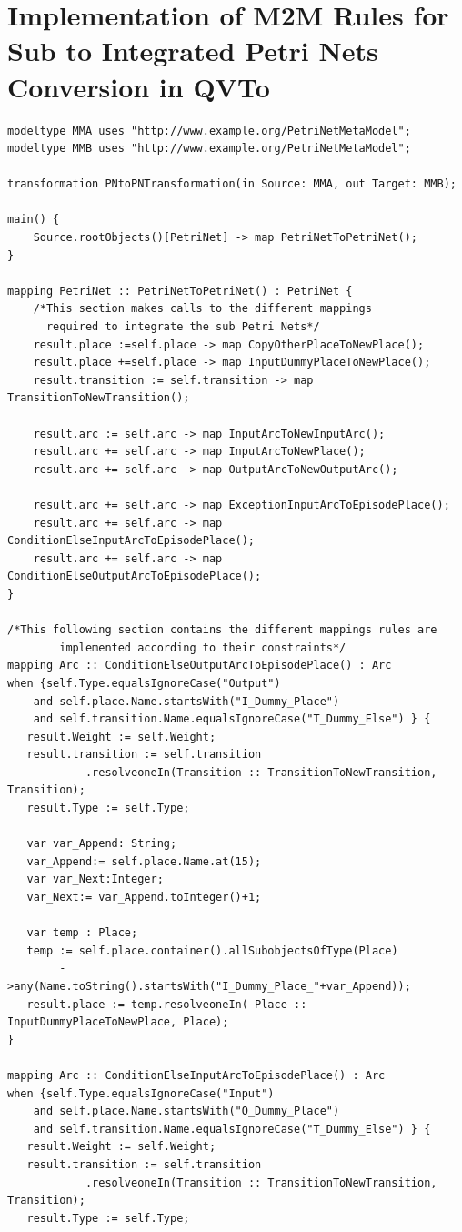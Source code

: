 \section{Implementation of M2M Rules for Sub to Integrated Petri Nets Conversion in QVTo}\label{m2mrules}
\begin{verbatim}
modeltype MMA uses "http://www.example.org/PetriNetMetaModel";
modeltype MMB uses "http://www.example.org/PetriNetMetaModel";

transformation PNtoPNTransformation(in Source: MMA, out Target: MMB);

main() {
	Source.rootObjects()[PetriNet] -> map PetriNetToPetriNet();
}

mapping PetriNet :: PetriNetToPetriNet() : PetriNet {
	/*This section makes calls to the different mappings 
	  required to integrate the sub Petri Nets*/
	result.place :=self.place -> map CopyOtherPlaceToNewPlace();
	result.place +=self.place -> map InputDummyPlaceToNewPlace();
	result.transition := self.transition -> map TransitionToNewTransition();
	
	result.arc := self.arc -> map InputArcToNewInputArc();
	result.arc += self.arc -> map InputArcToNewPlace();
	result.arc += self.arc -> map OutputArcToNewOutputArc();
	
	result.arc += self.arc -> map ExceptionInputArcToEpisodePlace();
	result.arc += self.arc -> map ConditionElseInputArcToEpisodePlace();
	result.arc += self.arc -> map ConditionElseOutputArcToEpisodePlace();
}

/*This following section contains the different mappings rules are 
		implemented according to their constraints*/
mapping Arc :: ConditionElseOutputArcToEpisodePlace() : Arc
when {self.Type.equalsIgnoreCase("Output") 
	and self.place.Name.startsWith("I_Dummy_Place")
	and self.transition.Name.equalsIgnoreCase("T_Dummy_Else") } {
   result.Weight := self.Weight;
   result.transition := self.transition
			.resolveoneIn(Transition :: TransitionToNewTransition, Transition);
   result.Type := self.Type;
      
   var var_Append: String;
   var_Append:= self.place.Name.at(15);
   var var_Next:Integer;
   var_Next:= var_Append.toInteger()+1;
   
   var temp : Place;
   temp := self.place.container().allSubobjectsOfType(Place)
		->any(Name.toString().startsWith("I_Dummy_Place_"+var_Append));
   result.place := temp.resolveoneIn( Place :: InputDummyPlaceToNewPlace, Place);
}

mapping Arc :: ConditionElseInputArcToEpisodePlace() : Arc
when {self.Type.equalsIgnoreCase("Input") 
	and self.place.Name.startsWith("O_Dummy_Place")
	and self.transition.Name.equalsIgnoreCase("T_Dummy_Else") } {
   result.Weight := self.Weight;
   result.transition := self.transition
			.resolveoneIn(Transition :: TransitionToNewTransition, Transition);
   result.Type := self.Type;
     

\end{verbatim}
